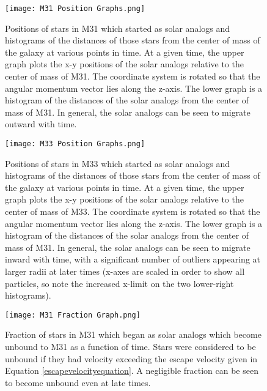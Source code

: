 \documentclass{aastex63}
\begin{document}
\newpage


{}




\begin{figure}
    \centering
    \texttt{[image: M31 Position Graphs.png]}
    \caption{Positions of stars in M31 which started as solar analogs and histograms of the distances of those stars from the center of mass of the galaxy at various points in time. At a given time, the upper graph plots the x-y positions of the solar analogs relative to the center of mass of M31. The coordinate system is rotated so that the angular momentum vector lies along the z-axis. The lower graph is a histogram of the distances of the solar analogs from the center of mass of M31. In general, the solar analogs can be seen to migrate outward with time.}
    \label{m31positiongraphs}
\end{figure}

\begin{figure}
    \centering
    \texttt{[image: M33 Position Graphs.png]}
    \caption{Positions of stars in M33 which started as solar analogs and histograms of the distances of those stars from the center of mass of the galaxy at various points in time. At a given time, the upper graph plots the x-y positions of the solar analogs relative to the center of mass of M33. The coordinate system is rotated so that the angular momentum vector lies along the z-axis. The lower graph is a histogram of the distances of the solar analogs from the center of mass of M31. In general, the solar analogs can be seen to migrate inward with time, with a significant number of outliers appearing at larger radii at later times (x-axes are scaled in order to show all particles, so note the increased x-limit on the two lower-right histograms).}
    \label{m33positiongraphs}
\end{figure}

\begin{figure}
    \centering
    \texttt{[image: M31 Fraction Graph.png]}
    \caption{Fraction of stars in M31 which began as solar analogs which become unbound to M31 as a function of time. Stars were considered to be unbound if they had velocity exceeding the escape velocity given in Equation \ref{escapevelocityequation}. A negligible fraction can be seen to become unbound even at late times.}
    \label{m31fractiongraph}
\end{figure}
\end{document}
